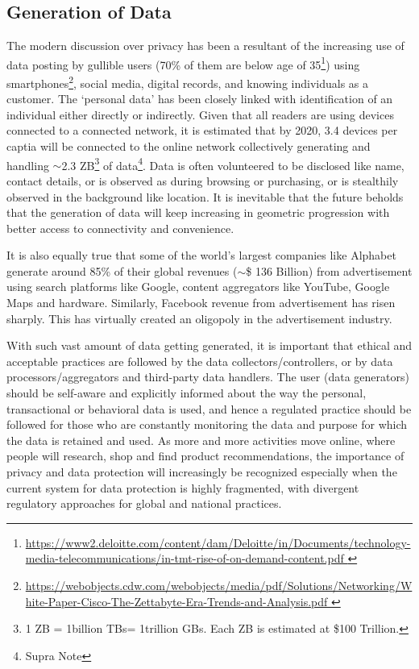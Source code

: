 \begin{multicols}{2}
\section{Generation of Data}

The modern discussion over privacy has been a resultant of the increasing use of data posting by gullible users (70\% of them are below age of 35\footnote{\url{https://www2.deloitte.com/content/dam/Deloitte/in/Documents/technology-media-telecommunications/in-tmt-rise-of-on-demand-content.pdf }}) using smartphones\footnote{\url{https://webobjects.cdw.com/webobjects/media/pdf/Solutions/Networking/White-Paper-Cisco-The-Zettabyte-Era-Trends-and-Analysis.pdf }}, social media, digital records, and knowing individuals as a customer. The ‘personal data’ has been closely linked with identification of an individual either directly or indirectly. Given that all readers are using devices connected to a connected network, it is estimated that by 2020, 3.4 devices per captia will be connected to the online network collectively generating and handling $\sim$2.3 ZB\footnote{1 ZB = 1billion TBs= 1trillion GBs. Each ZB is estimated at \$100 Trillion.} of data\footnote{Supra Note}. Data is often volunteered to be disclosed like name, contact details, or is observed as during browsing or purchasing, or is stealthily observed in the background like location. It is inevitable that the future beholds that the generation of data will keep increasing in geometric progression with better access to connectivity and convenience.

It is also equally true that some of the world's largest companies like Alphabet generate around 85\% of their global revenues ($\sim$\$ 136 Billion) from advertisement using search platforms like Google, content aggregators like YouTube, Google Maps and hardware. Similarly, Facebook revenue from advertisement has risen sharply. This has virtually created an oligopoly in the advertisement industry.

With such vast amount of data getting generated, it is important that ethical and acceptable practices are followed by the data collectors/controllers, or by data processors/aggregators and third-party data handlers. The user (data generators) should be self-aware and explicitly informed about the way the personal, transactional or behavioral data is used, and hence a regulated practice should be followed for those who are constantly monitoring the data and purpose for which the data is retained and used. As more and more activities move online, where people will research, shop and find product recommendations, the importance of privacy and data protection will  increasingly be recognized especially when the current system for data protection is highly fragmented, with divergent regulatory approaches for global and national practices. 


\end{multicols}
